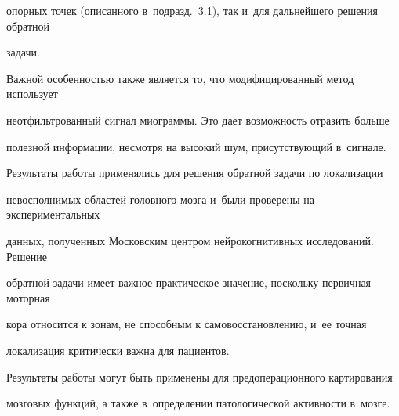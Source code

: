 опорных точек (описанного в~подразд.~3.1), так и~для дальнейшего решения обратной 

задачи.



Важной особенностью также является то, что модифицированный метод использует 

неотфильтрованный сигнал миограммы. Это дает возможность отразить больше 

полезной информации, несмотря на высокий шум, присутствующий в~сигнале.



Результаты работы применялись для решения обратной задачи по локализации 

невосполнимых областей головного мозга и~были проверены на экспериментальных 

данных, полученных Московским центром нейрокогнитивных исследований. Решение 

обратной задачи имеет важное практическое значение, поскольку первичная моторная 

кора относится к зонам, не способным к самовосстановлению, и~ее точная 

локализация критически важна для пациентов.



Результаты работы могут быть применены для предоперационного картирования 

мозговых функций, а также в~определении патологической активности в~мозге.



